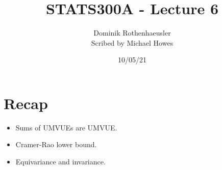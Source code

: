 




\title{STATS300A - Lecture 6}
\author{Dominik Rothenhaeusler\\ Scribed by Michael Howes}
\date{10/05/21}

\pagestyle{fancy}
\fancyhf{}


\maketitle
\tableofcontents
\section{Recap}
\begin{itemize}
    \item Sums of UMVUEs are UMVUE.
    \item Cramer-Rao lower bound.
    \item Equivariance and invariance.
\end{itemize}
